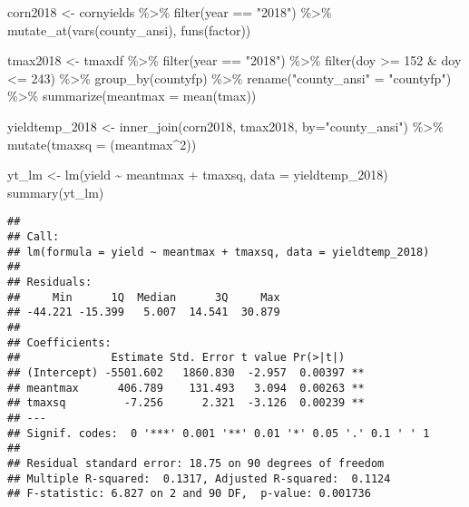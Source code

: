 \documentclass[
]{book}
\newenvironment{Shaded}{\begin{snugshade}}{\end{snugshade}}
\newcommand{\AttributeTok}[1]{\textcolor[rgb]{0.77,0.63,0.00}{#1}}
\newcommand{\DecValTok}[1]{\textcolor[rgb]{0.00,0.00,0.81}{#1}}
\newcommand{\FunctionTok}[1]{\textcolor[rgb]{0.00,0.00,0.00}{#1}}
\newcommand{\NormalTok}[1]{#1}
\newcommand{\OtherTok}[1]{\textcolor[rgb]{0.56,0.35,0.01}{#1}}
\newcommand{\SpecialCharTok}[1]{\textcolor[rgb]{0.00,0.00,0.00}{#1}}
\newcommand{\StringTok}[1]{\textcolor[rgb]{0.31,0.60,0.02}{#1}}
\begin{document}
\begin{Shaded}
\begin{Highlighting}[]
\NormalTok{corn2018 }\OtherTok{\textless{}{-}}\NormalTok{ cornyields }\SpecialCharTok{\%\textgreater{}\%}
  \FunctionTok{filter}\NormalTok{(year }\SpecialCharTok{==} \StringTok{"2018"}\NormalTok{) }\SpecialCharTok{\%\textgreater{}\%}
  \FunctionTok{mutate\_at}\NormalTok{(}\FunctionTok{vars}\NormalTok{(county\_ansi), }\FunctionTok{funs}\NormalTok{(factor))}
  
\NormalTok{tmax2018 }\OtherTok{\textless{}{-}}\NormalTok{ tmaxdf }\SpecialCharTok{\%\textgreater{}\%}
  \FunctionTok{filter}\NormalTok{(year }\SpecialCharTok{==} \StringTok{"2018"}\NormalTok{) }\SpecialCharTok{\%\textgreater{}\%}
  \FunctionTok{filter}\NormalTok{(doy }\SpecialCharTok{\textgreater{}=} \DecValTok{152} \SpecialCharTok{\&}\NormalTok{ doy }\SpecialCharTok{\textless{}=} \DecValTok{243}\NormalTok{) }\SpecialCharTok{\%\textgreater{}\%}
  \FunctionTok{group\_by}\NormalTok{(countyfp) }\SpecialCharTok{\%\textgreater{}\%}
  \FunctionTok{rename}\NormalTok{(}\StringTok{"county\_ansi"} \OtherTok{=} \StringTok{"countyfp"}\NormalTok{) }\SpecialCharTok{\%\textgreater{}\%}
  \FunctionTok{summarize}\NormalTok{(}\AttributeTok{meantmax =} \FunctionTok{mean}\NormalTok{(tmax))}

\NormalTok{yieldtemp\_2018 }\OtherTok{\textless{}{-}} \FunctionTok{inner\_join}\NormalTok{(corn2018, tmax2018, }\AttributeTok{by=}\StringTok{"county\_ansi"}\NormalTok{) }\SpecialCharTok{\%\textgreater{}\%}
  \FunctionTok{mutate}\NormalTok{(}\AttributeTok{tmaxsq =}\NormalTok{ (meantmax}\SpecialCharTok{\^{}}\DecValTok{2}\NormalTok{))}

\NormalTok{yt\_lm }\OtherTok{\textless{}{-}} \FunctionTok{lm}\NormalTok{(yield }\SpecialCharTok{\textasciitilde{}}\NormalTok{ meantmax }\SpecialCharTok{+}\NormalTok{ tmaxsq, }\AttributeTok{data =}\NormalTok{ yieldtemp\_2018)}
\FunctionTok{summary}\NormalTok{(yt\_lm)}
\end{Highlighting}
\end{Shaded}

\begin{verbatim}
## 
## Call:
## lm(formula = yield ~ meantmax + tmaxsq, data = yieldtemp_2018)
## 
## Residuals:
##     Min      1Q  Median      3Q     Max 
## -44.221 -15.399   5.007  14.541  30.879 
## 
## Coefficients:
##              Estimate Std. Error t value Pr(>|t|)   
## (Intercept) -5501.602   1860.830  -2.957  0.00397 **
## meantmax      406.789    131.493   3.094  0.00263 **
## tmaxsq         -7.256      2.321  -3.126  0.00239 **
## ---
## Signif. codes:  0 '***' 0.001 '**' 0.01 '*' 0.05 '.' 0.1 ' ' 1
## 
## Residual standard error: 18.75 on 90 degrees of freedom
## Multiple R-squared:  0.1317, Adjusted R-squared:  0.1124 
## F-statistic: 6.827 on 2 and 90 DF,  p-value: 0.001736
\end{verbatim}
\end{document}
